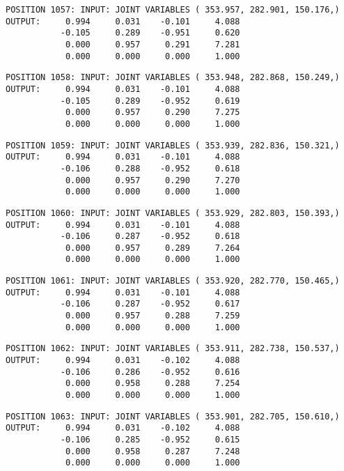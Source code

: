 \begin{verbatim}
POSITION 1057: INPUT: JOINT VARIABLES ( 353.957, 282.901, 150.176,)
OUTPUT:     0.994     0.031    -0.101     4.088
           -0.105     0.289    -0.951     0.620
            0.000     0.957     0.291     7.281
            0.000     0.000     0.000     1.000
\end{verbatim} \pagebreak[1]\begin{verbatim}
POSITION 1058: INPUT: JOINT VARIABLES ( 353.948, 282.868, 150.249,)
OUTPUT:     0.994     0.031    -0.101     4.088
           -0.105     0.289    -0.952     0.619
            0.000     0.957     0.290     7.275
            0.000     0.000     0.000     1.000
\end{verbatim} \pagebreak[1]\begin{verbatim}
POSITION 1059: INPUT: JOINT VARIABLES ( 353.939, 282.836, 150.321,)
OUTPUT:     0.994     0.031    -0.101     4.088
           -0.106     0.288    -0.952     0.618
            0.000     0.957     0.290     7.270
            0.000     0.000     0.000     1.000
\end{verbatim} \pagebreak[1]\begin{verbatim}
POSITION 1060: INPUT: JOINT VARIABLES ( 353.929, 282.803, 150.393,)
OUTPUT:     0.994     0.031    -0.101     4.088
           -0.106     0.287    -0.952     0.618
            0.000     0.957     0.289     7.264
            0.000     0.000     0.000     1.000
\end{verbatim} \pagebreak[1]\begin{verbatim}
POSITION 1061: INPUT: JOINT VARIABLES ( 353.920, 282.770, 150.465,)
OUTPUT:     0.994     0.031    -0.101     4.088
           -0.106     0.287    -0.952     0.617
            0.000     0.957     0.288     7.259
            0.000     0.000     0.000     1.000
\end{verbatim} \pagebreak[1]\begin{verbatim}
POSITION 1062: INPUT: JOINT VARIABLES ( 353.911, 282.738, 150.537,)
OUTPUT:     0.994     0.031    -0.102     4.088
           -0.106     0.286    -0.952     0.616
            0.000     0.958     0.288     7.254
            0.000     0.000     0.000     1.000
\end{verbatim} \pagebreak[1]\begin{verbatim}
POSITION 1063: INPUT: JOINT VARIABLES ( 353.901, 282.705, 150.610,)
OUTPUT:     0.994     0.031    -0.102     4.088
           -0.106     0.285    -0.952     0.615
            0.000     0.958     0.287     7.248
            0.000     0.000     0.000     1.000
\end{verbatim} \pagebreak[1]\begin{verbatim}

\end{verbatim}
